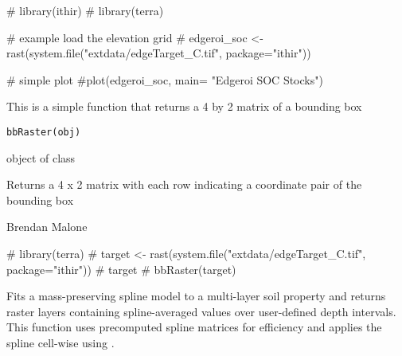 \documentclass[a4paper]{book}
\begin{document}
%
\begin{Examples}
\begin{ExampleCode}

# library(ithir)
# library(terra)

# example load the elevation grid
# edgeroi_soc <- rast(system.file("extdata/edgeTarget_C.tif", package="ithir"))

# simple plot
#plot(edgeroi_soc, main= "Edgeroi SOC Stocks")

\end{ExampleCode}
\end{Examples}
%
\begin{Description}
This is a simple function that returns a 4 by 2 matrix of a  bounding box
\end{Description}
%
\begin{Usage}
\begin{verbatim}
bbRaster(obj)
\end{verbatim}
\end{Usage}
%
\begin{Arguments}
\begin{ldescription}
\item[\code{obj}] object of class 
\end{ldescription}
\end{Arguments}
%
\begin{Value}
Returns a 4  x 2 matrix with each row indicating a coordinate pair of the bounding box
\end{Value}
%
\begin{Author}
Brendan Malone
\end{Author}
%
\begin{Examples}
\begin{ExampleCode}

# library(terra)
# target <- rast(system.file("extdata/edgeTarget_C.tif", package="ithir"))
# target
# bbRaster(target)

\end{ExampleCode}
\end{Examples}
%
\begin{Description}
Fits a mass-preserving spline model to a multi-layer soil property  and returns raster layers containing spline-averaged values over user-defined depth intervals.
This function uses precomputed spline matrices for efficiency and applies the spline cell-wise using .
\end{Description}
\end{document}
